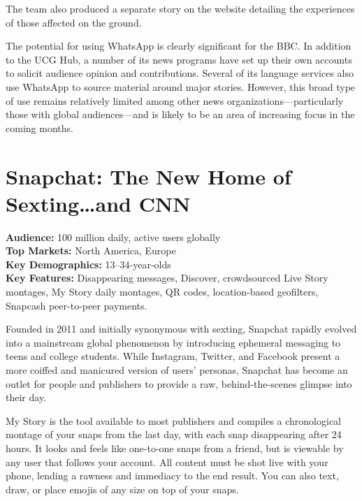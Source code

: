 \documentclass[notoc, symmetric, nobib, nols]{towcenter-guideto-book}
\begin{document}
The team also produced a separate story on the website detailing the experiences of those affected on the ground.\autocite{BBCNepal}


The potential for using WhatsApp is clearly significant for the BBC. In addition to the UCG Hub, a number of its news programs have set up their own accounts to solicit audience opinion and contributions. Several of its language services also use WhatsApp to source material around major stories. However, this broad type of use remains relatively limited among other news organizations---particularly those with global audiences---and is likely to be an area of increasing focus in the coming months.

\newpage
\section{Snapchat: The New Home of Sexting\ldots and CNN} 

\begin{framed}
\noindent\textbf{Audience:} 100 million daily, active users globally\\
\noindent\textbf{Top Markets:} North America, Europe\\
\noindent\textbf{Key Demographics:} 13--34-year-olds\\
\noindent\textbf{Key Features:} Disappearing messages, Discover, crowdsourced Live Story montages, My Story daily montages, QR codes, location-based geofilters, Snapcash peer-to-peer payments.
\end{framed}
\vspace{\baselineskip}
Founded in 2011 and initially synonymous with sexting,\autocite{FCSnapchat} Snapchat rapidly evolved into a mainstream global phenomenon by introducing ephemeral messaging to teens and college students.  While Instagram, Twitter, and Facebook present a more coiffed and manicured version of users' personas, Snapchat has become an outlet for people and publishers to provide a raw, behind-the-scenes glimpse into their day.

My Story is the tool available to most publishers and compiles a chronological montage of your snaps from the last day, with each snap disappearing after 24 hours. It looks and feels like one-to-one snaps from a friend, but is viewable by any user that follows your account. All content must be shot live with your phone, lending a rawness and immediacy to the end result. You can also text, draw, or place emojis of any size on top of your snaps.
\end{document}
